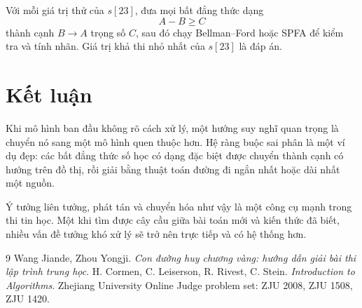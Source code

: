 \documentclass[11pt]{article}
\begin{document}
Với mỗi giá trị thử của \(s[23]\), đưa mọi bất đẳng thức dạng
\[
  A-B\ge C
\]
thành cạnh \(B\to A\) trọng số \(C\), sau đó chạy Bellman--Ford hoặc SPFA để
kiểm tra và tính nhãn. Giá trị khả thi nhỏ nhất của \(s[23]\) là đáp án.

\section{Kết luận}

Khi mô hình ban đầu không rõ cách xử lý, một hướng suy nghĩ quan trọng là
chuyển nó sang một mô hình quen thuộc hơn. Hệ ràng buộc sai phân là một ví dụ
đẹp: các bất đẳng thức số học có dạng đặc biệt được chuyển thành cạnh có hướng
trên đồ thị, rồi giải bằng thuật toán đường đi ngắn nhất hoặc dài nhất một
nguồn.

Ý tưởng liên tưởng, phát tán và chuyển hóa như vậy là một công cụ mạnh trong
thi tin học. Một khi tìm được cây cầu giữa bài toán mới và kiến thức đã biết,
nhiều vấn đề tưởng khó xử lý sẽ trở nên trực tiếp và có hệ thống hơn.

\begin{thebibliography}{9}
Wang Jiande, Zhou Yongji. \emph{Con đường huy chương vàng: hướng dẫn giải bài
thi lập trình trung học}.
H. Cormen, C. Leiserson, R. Rivest, C. Stein. \emph{Introduction to
Algorithms}.
Zhejiang University Online Judge problem set: ZJU 2008, ZJU 1508, ZJU 1420.
\end{thebibliography}
\end{document}
